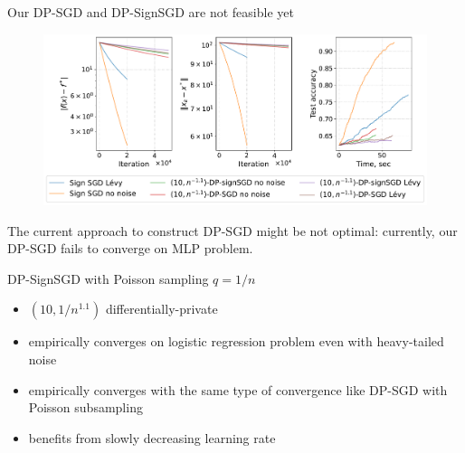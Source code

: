 \documentclass{beamer}
\begin{document}
\begin{frame}{Our DP-SGD and DP-SignSGD are not feasible yet}
    \begin{figure}
        \centering
        \includegraphics[width=1\textwidth]{v28_10eps_short.pdf}
    \end{figure}
    The current approach to construct DP-SGD might be not optimal: currently, our DP-SGD fails to converge on MLP problem.
\end{frame}
\begin{frame}{DP-SignSGD with Poisson sampling $q = 1/n$}
    \begin{itemize}
        \item $(10, 1/n^{1.1})$ differentially-private
        \item empirically converges on logistic regression problem even with heavy-tailed noise
        \item empirically converges with the same type of convergence like DP-SGD with Poisson subsampling
        \item benefits from slowly decreasing learning rate
    \end{itemize}
\end{frame}
\end{document}
